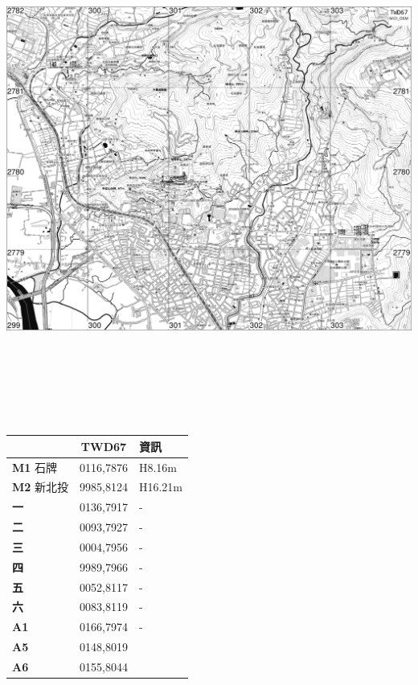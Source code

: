 \documentclass{article}
\begin{document}
\begin{CJK*}{UTF8}{bkai}
\begin{multicols}{2}

\includegraphics[width=20.73cm, height=16.58cm]{osm-map.png}
\begin{tabular}{|l|c|l|}
	\hline
	&TWD67&資訊\\  
	\hline
	\textbf{M1} 石牌&0116,7876&H8.16m\\
	\textbf{M2} 新北投&9985,8124&H16.21m\\
	\hline
	\textbf{一}&0136,7917&-\\
	\textbf{二}&0093,7927&-\\
	\textbf{三}&0004,7956&-\\
	\textbf{四}&9989,7966&-\\
	\textbf{五}&0052,8117&-\\
	\textbf{六}&0083,8119&-\\
	\hline
	\textbf{A1}&0166,7974&-\\
	\textbf{A5}&0148,8019&\\
	\textbf{A6}&0155,8044& \\

\end{tabular}
\end{multicols}
\end{CJK*}
\end{document}
